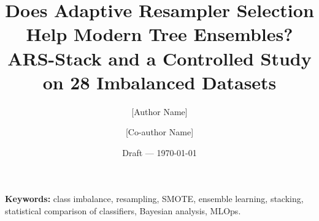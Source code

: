 \documentclass[10pt]{article}
\title{\textbf{Does Adaptive Resampler Selection Help Modern Tree Ensembles?\\
ARS-Stack and a Controlled Study on 28 Imbalanced Datasets}}
\author[1]{[Author Name]}
\author[1]{[Co-author Name]}
\affil[1]{[Department, Institution, City, Country]\\ \texttt{[email@institution.edu]}}
\date{Draft --- \today}
\begin{document}
\maketitle

\begin{abstract}

\end{abstract}

\noindent\textbf{Keywords:} class imbalance, resampling, SMOTE, ensemble learning, stacking, statistical comparison
of classifiers, Bayesian analysis, MLOps.










\setlength{\bibsep}{1.5pt plus 0.3ex}
\begingroup\footnotesize

\endgroup
\end{document}
